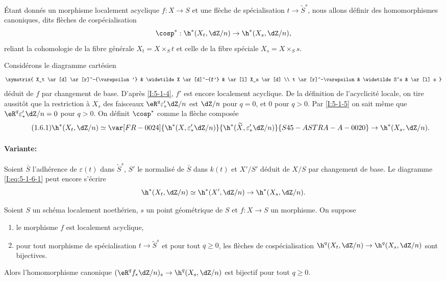 \begin{sourceinline}\label{I:5-1-6}

Étant donnés un morphisme localement acyclique $f:X\to S$ et une flèche de 
spécialisation $t\to \widetilde S^s$, nous allons définir des 
homomorphismes canoniques, dits flèches de cospécialisation 
\[
  \cosp^* : \h^*(X_t,\dZ/n) \to \h^*(X_s,\dZ/n)\text{,}
\]
reliant la cohomologie de la fibre générale $X_t=X\times_S t$ et celle de la 
fibre spéciale $X_s=X\times_S s$. 
\end{sourceinline}
Considérons le diagramme cartésien 
\[\xymatrix{
  X_t \ar[d] \ar[r]^-{\varepsilon'} 
    & \widetilde X \ar[d]^-{f'} 
    & \ar[l] X_s \ar[d] \\
  t \ar[r]^-\varepsilon 
    & \widetilde S^s 
    & \ar[l] s
}\]
déduit de $f$ par changement de base. D'après \ref{I:5-1-4}, $f'$ est encore 
localement acyclique. De la définition de l'acyclicité locale, on tire 
aussitôt que la restriction à $X_s$ des faisceaux $\eR^q \varepsilon_*' \dZ/n$ 
est $\dZ/n$ pour $q=0$, et $0$ pour $q>0$. Par \ref{I:5-1-5} on sait même que 
$\eR^q \varepsilon_*'\dZ/n = 0$ pour $q>0$. On définit $\cosp^*$ comme la 
flèche composée 
\begingroup
\makeatletter
\tagsleft@true
\let\veqno\@@leqno
\makeatother
\begin{equation*}\tag{1.6.1}\label{I:eq:5-1-6-1}
  \h^*(X_t,\dZ/n) \simeq \var[FR-0024]{\h^*(X,\varepsilon_*' \dZ/n)}{\h^*(\widetilde X,\varepsilon_*' \dZ/n)}{S45-ASTRA-A-0020} \to \h^*(X_s,\dZ/n) \text{.}
\end{equation*}
\endgroup

\paragraph{Variante:}
Soient $\bar S$ l'adhérence de $\varepsilon(t)$ dans $\widetilde S^s$, $S'$ le 
normalisé de $\bar S$ dans $k(t)$ et $X'/S'$ déduit de $X/S$ par changement 
de base. Le diagramme \eqref{I:eq:5-1-6-1} peut encore s'écrire 
\[
  \h^*(X_t,\dZ/n) \simeq \h^*(X',\dZ/n) \to \h^*(X_s,\dZ/n) \text{.}
\]





\begin{theoremdotdash}\label{I:5-1-7}
Soient $S$ un schéma localement noethérien, $s$ un point géométrique de 
$S$ et $f:X\to S$ un morphisme. On suppose 
\begin{enumerate}[\indent a)]
  \item le morphisme $f$ est localement acyclique, 
  \item pour tout morphisme de spécialisation $t\to \widetilde S^s$ et pour 
    tout $q\geqslant 0$, les flèches de cospécialisation 
    $\h^q(X_t,\dZ/n) \to \h^q(X_s,\dZ/n)$ sont bijectives.
\end{enumerate}

Alors l'homomorphisme canonique $(\eR^q f_*\dZ/n)_s\to \h^q(X_s,\dZ/n)$ est 
bijectif pour tout $q\geqslant 0$. 
\end{theoremdotdash}

